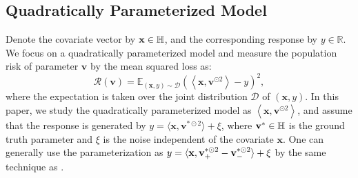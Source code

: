 \subsection{Quadratically Parameterized Model}
Denote the covariate vector by $\mathbf{x}\in \mathbb{H}$, and the corresponding response by $y\in \mathbb{R}$.
We focus on a quadratically parameterized model and measure the population risk of parameter $\mathbf{v}$ by the mean squared loss as:
\begin{equation}\nonumber
    \mathcal{R} \left ( \mathbf{v} \right )=\mathbb{E}_{\left ( \mathbf{x},y  \right ) \sim \mathcal{D} } \left ( \left \langle \mathbf{x},\mathbf{v}^{\odot 2} \right \rangle  -y  \right )^2 ,
\end{equation}
where the expectation is taken over the joint distribution $\mathcal{D}$ of $\left ( \mathbf{x} ,y \right ) $.
In this paper, we study the quadratically parameterized model as $\left \langle \mathbf{x},\mathbf{v}^{\odot 2} \right \rangle$, and assume that the response is generated by $y=\langle \mathbf{x},\mathbf{v}^{*\odot 2}\rangle +\xi $, where $\mathbf{v}^*\in \mathbb{H}$ is the ground truth parameter and $\xi$ is the noise independent of the covariate $\mathbf{x}$.
One can generally use the parameterization as $y=\langle\mathbf{x},\mathbf{v}_+^{*\odot2}-\mathbf{v}_-^{*\odot2}\rangle+\xi$ by the same technique as \citet{woodworth2020kernel}.
 



